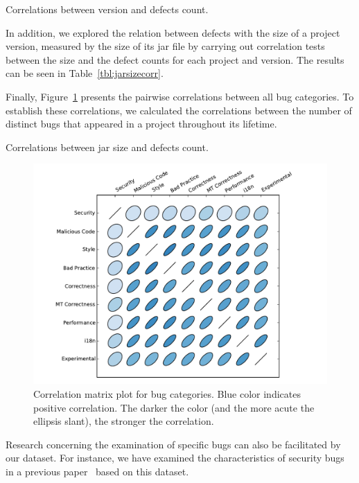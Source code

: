 \documentclass{sig-alternate}
\begin{document}
\begin{table}[b]
    \centering
        
	\caption{Correlations between version and defects count.}
    \label{tbl:bugsperversion}
\end{table}

In addition, we explored the relation between defects
with the size of a project
version, measured by the size of its {\sc jar} file by carrying out
correlation tests between the size and the defect counts for each
project and version. The results can be seen in
Table~\ref{tbl:jarsizecorr}.

Finally, Figure~\ref{fig:corrplot} presents the pairwise correlations
between all bug categories. To establish these correlations,
we calculated the correlations between the number of
distinct bugs that appeared in a project throughout its lifetime.

\begin{table}[hbt]
    \centering
    
    \caption{Correlations between {\sc jar} size and defects count.}
    \label{tbl:jarsizecorr}
\end{table}


\begin{figure}
  \centering
  \includegraphics[scale=0.43]{corrplot.pdf}
  \caption{Correlation matrix plot for bug categories.
Blue color indicates positive correlation.
The darker the color (and the more acute the ellipsis slant),
the stronger the correlation.}
  \label{fig:corrplot}
\end{figure}

Research concerning the examination of specific bugs
can also be facilitated by our dataset. For instance,
we have examined the characteristics of security
bugs in a previous paper~\cite{MKLGS13}
based on this dataset.
\end{document}
